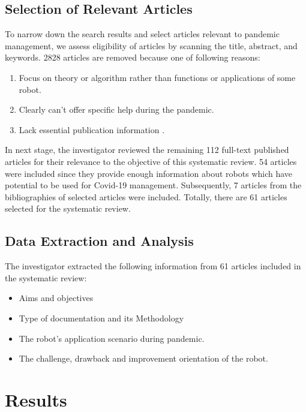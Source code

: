 \documentclass[a4paper]{article}
\begin{document}
\subsection{Selection of Relevant Articles}
    To narrow down the search results and select articles relevant to pandemic management, we assess eligibility of articles by scanning the title, abstract, and keywords. 2828 articles are removed because one of following reasons:
\begin{enumerate}
    \item Focus on theory or algorithm rather than functions or applications of some robot.
    \item Clearly can't offer specific help during the pandemic.
    \item Lack essential publication information  . 
\end{enumerate}
    In next stage, the investigator reviewed the remaining 112 full-text published articles for their relevance to the objective of this systematic review. 54 articles were included since they provide enough information about robots which have potential to be used for Covid-19 management. Subsequently, 7 articles from the bibliographies of selected articles were included. Totally, there are 61 articles selected for the systematic review. 
\subsection{Data Extraction and Analysis}
The investigator extracted the following information from 61 articles included in the systematic review:
\begin{itemize}
    \item Aims and objectives
    \item Type of documentation and its Methodology
    \item The robot's application scenario during pandemic.
    \item The challenge, drawback and improvement orientation of the robot. 
\end{itemize}
\section{Results}
\end{document}
